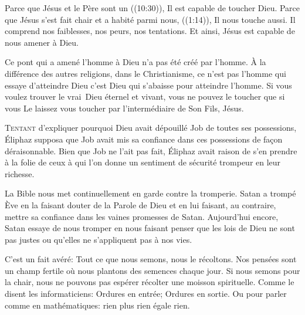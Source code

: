
Parce que Jésus et le Père sont un ((10:30)),
 Il est capable de toucher Dieu.
 Parce que Jésus \Og s'est fait chair et a habité parmi nous, \Fg{}
 ((1:14)), Il nous touche aussi.
 Il comprend nos faiblesses, nos peurs, nos tentations.
 Et ainsi, Jésus est capable de nous amener à Dieu.

Ce pont qui a amené l'homme à Dieu n'a pas été créé par l'homme.
 À la différence des autres religions, dans le Christianisme,
 ce n'est pas l'homme qui essaye d'atteindre Dieu
 \ocadr{}c'est Dieu qui s'abaisse pour atteindre l'homme.
 Si vous voulez trouver le vrai~Dieu éternel et vivant,
 vous ne pouvez le toucher que si vous Le laissez vous toucher
 par l'intermédiaire de Son Fils, Jésus. 

\dvrule






\lettrine{T}{entant} d'expliquer pourquoi Dieu avait dépouillé Job
 de toutes ses possessions, Éliphaz supposa que Job avait mis sa confiance
 dans ces possessions de fa\c{c}on déraisonnable.
 Bien que Job ne l'ait pas fait, Éliphaz avait raison de s'en prendre
 à la folie de ceux à qui l'on donne un sentiment de sécurité trompeur
 en leur richesse. 

La Bible nous met continuellement en garde contre la tromperie.
 Satan a trompé Ève en la faisant douter de la Parole de Dieu
 et en lui faisant, au contraire, mettre sa confiance dans les vaines
 promesses de Satan.
 Aujourd'hui encore, Satan essaye de nous tromper en nous faisant penser
 que les lois de Dieu ne sont pas justes ou qu'elles ne s'appliquent
 pas à nos vies. 


C'est un fait avéré: Tout ce que nous semons, nous le récoltons.
 Nos pensées sont un champ fertile où nous plantons des semences chaque jour.
 Si nous semons pour la chair, nous ne pouvons pas espérer récolter
 une moisson spirituelle.
 Comme le disent les informaticiens:
 \Og Ordures en entrée; Ordures en sortie. \Fg{}
 Ou pour parler comme en mathématiques: rien plus rien égale rien. 

